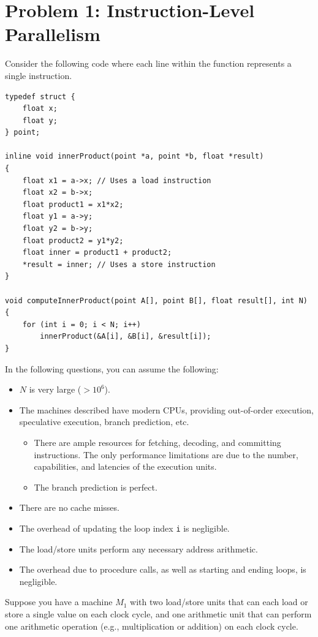 \documentclass[11pt]{article}
\begin{document}
\newpage

\section*{Problem 1: Instruction-Level Parallelism}

Consider the following code where each line within the function
represents a single instruction.
\begin{lstlisting}
typedef struct {
    float x;
    float y;
} point;

inline void innerProduct(point *a, point *b, float *result)
{
    float x1 = a->x; // Uses a load instruction
    float x2 = b->x;
    float product1 = x1*x2;
    float y1 = a->y;
    float y2 = b->y;
    float product2 = y1*y2;
    float inner = product1 + product2;
    *result = inner; // Uses a store instruction
}

void computeInnerProduct(point A[], point B[], float result[], int N)
{
    for (int i = 0; i < N; i++)
        innerProduct(&A[i], &B[i], &result[i]);
}
\end{lstlisting}

In the following questions,
you can assume the following:
\begin{itemize}
\item $N$ is very large ($> 10^6$).
\item The machines described have modern CPUs, providing
out-of-order execution, speculative execution, branch prediction, etc.
\begin{itemize}
\item There are ample resources for fetching, decoding, and committing instructions.  The only performance limitations are due to
the number, capabilities, and latencies of the execution units.
\item The branch prediction is perfect.
\end{itemize}
\item There are no cache misses.
\item The overhead of updating
the loop index {\tt i} is negligible.
\item The load/store units perform any necessary address arithmetic.
\item The overhead due to procedure calls, as well as starting and ending loops, is negligible.
\end{itemize}

\newpage

Suppose you have a machine $M_1$ with two load/store units
  that can each load or store a single value on each clock cycle, and
  one arithmetic unit that can perform one arithmetic operation
  (e.g., multiplication or addition) on each clock cycle.
\end{document}
